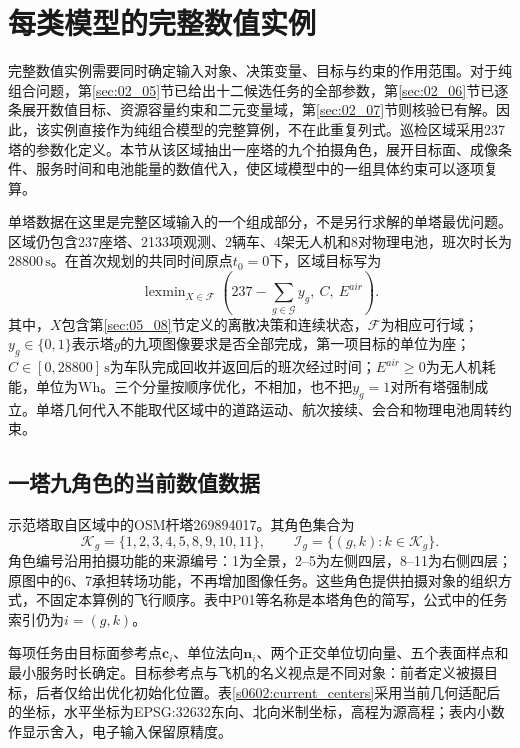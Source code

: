 \section{每类模型的完整数值实例}
\label{sec:06_02}

完整数值实例需要同时确定输入对象、决策变量、目标与约束的作用范围。对于纯组合问题，第\ref{sec:02_05}节已给出十二候选任务的全部参数，第\ref{sec:02_06}节已逐条展开数值目标、资源容量约束和二元变量域，第\ref{sec:02_07}节则核验已有解。因此，该实例直接作为纯组合模型的完整算例，不在此重复列式。巡检区域采用237塔的参数化定义。本节从该区域抽出一座塔的九个拍摄角色，展开目标面、成像条件、服务时间和电池能量的数值代入，使区域模型中的一组具体约束可以逐项复算。

单塔数据在这里是完整区域输入的一个组成部分，不是另行求解的单塔最优问题。区域仍包含237座塔、2133项观测、2辆车、4架无人机和8对物理电池，班次时长为$28800\,\mathrm s$。在首次规划的共同时间原点$t_0=0$下，区域目标写为
\begin{equation}
 \operatorname{lexmin}_{X\in\mathcal F}
 \left(237-\sum_{g\in\mathcal G}y_g,\ C,\ E^{air}\right).
 \label{s0602:regional_objective}
\end{equation}
其中，$X$包含第\ref{sec:05_08}节定义的离散决策和连续状态，$\mathcal F$为相应可行域；$y_g\in\{0,1\}$表示塔$g$的九项图像要求是否全部完成，第一项目标的单位为座；$C\in[0,28800]\,\mathrm s$为车队完成回收并返回后的班次经过时间；$E^{air}\ge0$为无人机耗能，单位为$\mathrm{Wh}$。三个分量按顺序优化，不相加，也不把$y_g=1$对所有塔强制成立。单塔几何代入不能取代区域中的道路运动、航次接续、会合和物理电池周转约束。

\subsection{一塔九角色的当前数值数据}

示范塔取自区域中的OSM杆塔269894017。其角色集合为
\begin{equation}
 \mathcal K_g=\{1,2,3,4,5,8,9,10,11\},\qquad
 \mathcal I_g=\{(g,k):k\in\mathcal K_g\}.
 \label{s0602:role_set}
\end{equation}
角色编号沿用拍摄功能的来源编号：1为全景，2--5为左侧四层，8--11为右侧四层；原图中的6、7承担转场功能，不再增加图像任务\cite{LiInspection2023}。这些角色提供拍摄对象的组织方式，不固定本算例的飞行顺序。表中P01等名称是本塔角色的简写，公式中的任务索引仍为$i=(g,k)$。

每项任务由目标面参考点$\mathbf c_i$、单位法向$\mathbf n_i$、两个正交单位切向量、五个表面样点和最小服务时长确定。目标参考点与飞机的名义视点是不同对象：前者定义被摄目标，后者仅给出优化初始化位置。表\ref{s0602:current_centers}采用当前几何适配后的坐标，水平坐标为EPSG:32632东向、北向米制坐标，高程为源高程；表内小数作显示舍入，电子输入保留原精度。

